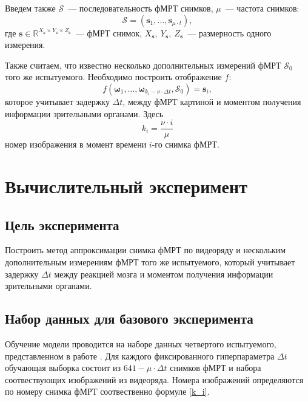 \documentclass[12pt,twoside]{article}
\begin{document}
Введем также $\mathcal{S}$~--- последовательность фМРТ снимков,  $\mu$~--- частота снимков:
\begin{equation}
    \mathcal{S} = (\bm{s}_{1}, \dots, \bm{s}_{\mu \cdot t}),
\end{equation}
где $\bm{s} \in \mathbb{R}^{X_{\bm{s}} \times Y_{\bm{s}} \times Z_{\bm{s}}}$~--- фМРТ снимок, $X_{\bm{s}},~Y_{\bm{s}},~Z_{\bm{s}}$~--- размерность одного измерения.

Также считаем, что известно несколько дополнительных измерений фМРТ $\mathcal{S}_0$ того же испытуемого.
Необходимо построить отображение $f$:
\begin{equation}
    f(\bm{\omega}_{1}, \dots, \bm{\omega}_{k_i - \nu \cdot \Delta t}, \mathcal{S}_0) = \bm{s}_i,
\end{equation}
которое учитывает задержку $\Delta t$, между фМРТ картиной и моментом получения информации зрительными органами.
Здесь
\begin{equation}
    \label{k_i}
    k_i = \dfrac{\nu \cdot i}{\mu}
\end{equation}
 номер изображения в момент времени $i$-го снимка фМРТ.
\section{Вычислительный эксперимент}
\subsection{Цель эксперимента}
Построить метод аппроксимации снимка фМРТ по видеоряду и нескольким дополнительным измерениям фМРТ того же испытуемого, который 
учитывает задержку $\Delta t$ между реакцией мозга и моментом получения информации зрительными органами. 
\subsection{Набор данных для базового эксперимента}
Обучение модели проводится на наборе данных четвертого испытуемого, представленном в работе \citep{Berezutskaya2022}. 
Для каждого фиксированного гиперпараметра $\Delta t$ обучающая выборка состоит из $641-\mu \cdot \Delta t$  снимков фМРТ и набора соотвествующих изображений из видеоряда. 
Номера изображений определяются по номеру снимка фМРТ соотвественно формуле \eqref{k_i}.  
\end{document}

